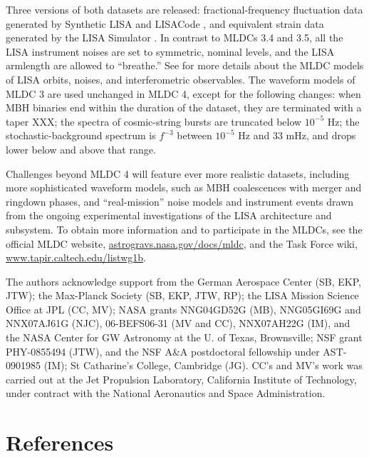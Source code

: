 \documentclass{iopart}
\begin{document}
Three versions of both datasets are released: fractional-frequency fluctuation data generated by Synthetic LISA \cite{synthlisa} and LISACode \cite{lisacode}, and equivalent strain data generated by the LISA Simulator \cite{lisasimulator}. In contrast to MLDCs 3.4 and 3.5, all the LISA instrument noises are set to symmetric, nominal levels, and the LISA armlength are allowed to ``breathe.'' See \cite{mldcgwdaw2,MLDC3} for more details about the MLDC models of LISA orbits, noises, and interferometric observables. The waveform models of MLDC 3 \cite{MLDC3} are used unchanged in MLDC 4, except for the following changes: when MBH binaries end within the duration of the dataset, they are terminated with a taper XXX; the spectra of cosmic-string bursts are truncated below $10^{-5}$ Hz; the stochastic-background spectrum is $f^{-3}$ between $10^{-5}$ Hz and 33 mHz, and drops lower below and above that range.

Challenges beyond MLDC 4 will feature ever more realistic datasets, including more sophisticated waveform models, such as MBH coalescences with merger and ringdown phases, and ``real-mission'' noise models and instrument events drawn from the ongoing experimental investigations of the LISA architecture and subsystem. To obtain more information and to participate in the MLDCs, see the official MLDC website, \url{astrogravs.nasa.gov/docs/mldc}, and the Task Force wiki, \url{www.tapir.caltech.edu/listwg1b}.

\ack
The authors acknowledge support from
the German Aerospace Center (SB, EKP, JTW);
the Max-Planck Society (SB, EKP, JTW, RP);
the LISA Mission Science Office at JPL (CC, MV);
NASA grants NNG04GD52G (MB),
  NNG05GI69G and NNX07AJ61G (NJC),
  06-BEFS06-31 (MV and CC),
  NNX07AH22G (IM),
  and the NASA Center for GW Astronomy at the U. of Texas, Brownsville;
NSF grant PHY-0855494 (JTW),
  and the NSF A\&A postdoctoral fellowship under AST-0901985 (IM);
St Catharine's College, Cambridge (JG).
CC's and MV's work was carried out at the Jet Propulsion Laboratory, California Institute of Technology, under contract with the National Aeronautics and Space Administration.

\section*{References}
\end{document}
